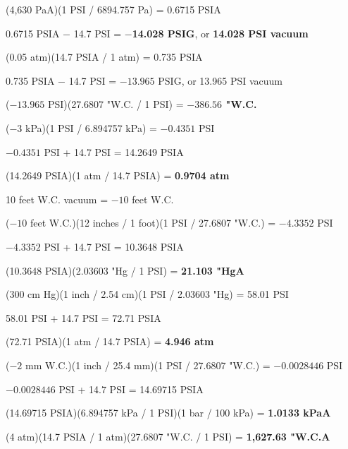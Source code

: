 (4,630 PaA)(1 PSI / 6894.757 Pa) = 0.6715 PSIA

0.6715 PSIA $-$ 14.7 PSI = {\bf $-$14.028 PSIG}, or {\bf 14.028 PSI vacuum}


\vskip 10pt


(0.05 atm)(14.7 PSIA / 1 atm) = 0.735 PSIA

0.735 PSIA $-$ 14.7 PSI = $-13.965$ PSIG, or 13.965 PSI vacuum

($-13.965$ PSI)(27.6807 "W.C. / 1 PSI) = {\bf $-386.56$ "W.C.}


\vskip 10pt


($-3$ kPa)(1 PSI / 6.894757 kPa) = $-0.4351$ PSI

$-0.4351$ PSI + 14.7 PSI = 14.2649 PSIA

(14.2649 PSIA)(1 atm / 14.7 PSIA) = {\bf 0.9704 atm}


\vskip 10pt


10 feet W.C. vacuum = $-10$ feet W.C.

($-10$ feet W.C.)(12 inches / 1 foot)(1 PSI / 27.6807 "W.C.) = $-4.3352$ PSI

$-4.3352$ PSI + 14.7 PSI = 10.3648 PSIA

(10.3648 PSIA)(2.03603 "Hg / 1 PSI) = {\bf 21.103 "HgA}


\vskip 10pt


(300 cm Hg)(1 inch / 2.54 cm)(1 PSI / 2.03603 "Hg) = 58.01 PSI

58.01 PSI + 14.7 PSI = 72.71 PSIA

(72.71 PSIA)(1 atm / 14.7 PSIA) = {\bf 4.946 atm}


\vskip 10pt


($-2$ mm W.C.)(1 inch / 25.4 mm)(1 PSI / 27.6807 "W.C.) = $-0.0028446$ PSI

$-0.0028446$ PSI + 14.7 PSI = 14.69715 PSIA

(14.69715 PSIA)(6.894757 kPa / 1 PSI)(1 bar / 100 kPa) = {\bf 1.0133 kPaA}


\vskip 10pt


(4 atm)(14.7 PSIA / 1 atm)(27.6807 "W.C. / 1 PSI) = {\bf 1,627.63 "W.C.A}






